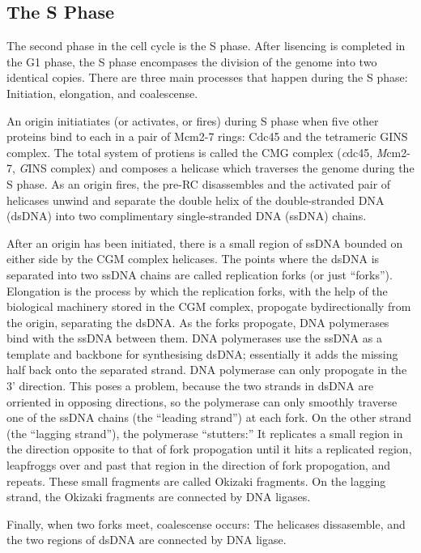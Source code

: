 \documentclass[serif]{sfuthesis}
\begin{document}
		\subsection{The S Phase}
		
		The second phase in the cell cycle is the S phase.
		After lisencing is completed in the G1 phase, the S phase encompases the division of the genome into two identical copies.
		There are three main processes that happen during the S phase: Initiation, elongation, and coalescense.
		
		An origin initiatiates (or activates, or fires) during S phase when five other proteins bind to each in a pair of Mcm2-7 rings: Cdc45 and the tetrameric GINS complex.
		The total system of protiens is called the CMG complex (\emph{c}dc45, \emph{M}cm2-7, \emph{G}INS complex) and composes a helicase which traverses the genome during the S phase.
		As an origin fires, the pre-RC disassembles and the activated pair of helicases unwind and separate the double helix of the double-stranded DNA (dsDNA) into two complimentary single-stranded DNA (ssDNA) chains. \cite{GINSComplex}
		
		After an origin has been initiated, there is a small region of ssDNA bounded on either side by the CGM complex helicases.
		The points where the dsDNA is separated into two ssDNA chains are called replication forks (or just ``forks'').
		Elongation is the process by which the replication forks, with the help of the biological machinery stored in the CGM complex, propogate bydirectionally from the origin, separating the dsDNA.
		As the forks propogate, DNA polymerases bind with the ssDNA between them.
		DNA polymerases use the ssDNA as a template and backbone for synthesising dsDNA; essentially it adds the missing half back onto the separated strand.
		DNA polymerase can only propogate in the 3' direction.
		This poses a problem, because the two strands in dsDNA are orriented in opposing directions, so the polymerase can only smoothly traverse one of the ssDNA chains (the ``leading strand'') at each fork.
		On the other strand (the ``lagging strand''), the polymerase ``stutters:'' It replicates a small region in the direction opposite to that of fork propogation until it hits a replicated region, leapfroggs over and past that region in the direction of fork propogation, and repeats.
		These small fragments are called Okizaki fragments.
		On the lagging strand, the Okizaki fragments are connected by DNA ligases.
		
		Finally, when two forks meet, coalescense occurs: The helicases dissasemble, and the two regions of dsDNA are connected by DNA ligase. \cite{MolecularCellBiology}
		
\end{document}

